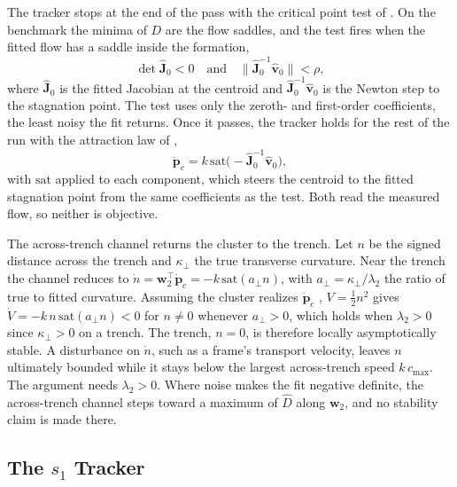 \documentclass[lettersize,journal]{IEEEtran}
\begin{document}
The tracker stops at the end of the pass with the critical point test of
\cite{10}. On the benchmark the minima of $D$ are the flow saddles, and
the test fires when the fitted flow has a saddle inside the formation,
\begin{equation}
    \det\hat{\mathbf{J}}_0 < 0
    \quad\text{and}\quad
    \bigl\|\hat{\mathbf{J}}_0^{-1}\hat{\mathbf{v}}_0\bigr\| < \rho,
    \label{eq:d_capture}
\end{equation}
where $\hat{\mathbf{J}}_0$ is the fitted Jacobian at the centroid and
$\hat{\mathbf{J}}_0^{-1}\hat{\mathbf{v}}_0$ is the Newton step to the
stagnation point. The test uses only the zeroth- and first-order
coefficients, the least noisy the fit returns. Once it passes, the tracker
holds for the rest of the run with the attraction law of \cite{10},
\begin{equation}
    \dot{\mathbf{p}}_c = k\,\mathrm{sat}\bigl(-\hat{\mathbf{J}}_0^{-1}\hat{\mathbf{v}}_0\bigr),
    \label{eq:d_hold}
\end{equation}
with $\mathrm{sat}$ applied to each component, which steers the centroid to
the fitted stagnation point from the same coefficients as the test. Both
read the measured flow, so neither is objective.

The across-trench channel returns the cluster to the trench. Let $n$ be
the signed distance across the trench and $\kappa_\perp$ the true
transverse curvature. Near the trench the channel reduces to
$\dot{n} = \mathbf{w}_2^\top\dot{\mathbf{p}}_c = -k\,\mathrm{sat}(a_\perp n)$,
with $a_\perp = \kappa_\perp/\lambda_2$ the ratio of true to fitted
curvature. Assuming the cluster realizes $\dot{\mathbf{p}}_c$ \cite{37,3},
$V = \tfrac{1}{2}n^2$ gives $\dot{V} = -k\,n\,\mathrm{sat}(a_\perp n) < 0$
for $n \neq 0$ whenever $a_\perp > 0$, which holds when $\lambda_2 > 0$
since $\kappa_\perp > 0$ on a trench. The trench, $n = 0$, is therefore
locally asymptotically stable. A disturbance on $\dot{n}$, such as a
frame's transport velocity, leaves $n$ ultimately bounded while it stays
below the largest across-trench speed $k\,c_{\max}$. The argument needs
$\lambda_2 > 0$. Where noise makes the fit negative definite, the
across-trench channel steps toward a maximum of $\hat{D}$ along
$\mathbf{w}_2$, and no stability claim is made there.

\subsection{The $s_1$ Tracker}
\label{sec:s1_controller}
\end{document}
